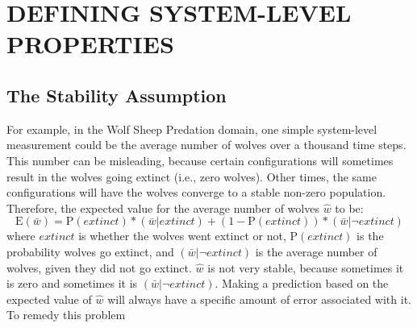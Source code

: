 \chapter{DEFINING SYSTEM-LEVEL PROPERTIES}
\thispagestyle{plain}

\label{Defining}






\section{The Stability Assumption}





For example, in the Wolf Sheep Predation domain, one simple system-level measurement could be the average number of wolves over a thousand time steps.
This number can be misleading, because certain configurations will sometimes result in the wolves going extinct (i.e., zero wolves).
Other times, the same configurations will have the wolves converge to a stable non-zero population.
Therefore, the expected value for the average number of wolves $\hat w$ to be:
\[\mathrm{E}(\bar w) = \mathrm{P}(extinct) * (\bar w | extinct) + (1 - \mathrm{P}(extinct)) * (\bar w | \neg extinct) \]
where $extinct$ is whether the wolves went extinct or not, $\mathrm{P}(extinct)$ is the probability wolves go extinct, and $(\bar w | \neg extinct)$ is the average number of wolves, given they did not go extinct.
$\hat w$ is not very stable, because sometimes it is zero and sometimes it is $(\bar w | \neg extinct)$.
Making a prediction based on the expected value of $\hat w$ will always have a specific amount of error associated with it.
To remedy this problem

